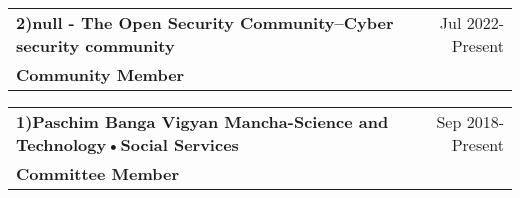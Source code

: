 \documentclass[a4paper,12pt]{article}
\begin{document}
\begin{tabularx}{\linewidth}{ @{}l r@{} }
\textbf{2)null - The Open Security Community--Cyber security community}&\hfill Jul 2022-Present \\[3.75pt]

\textbf{Community Member}  
\end{tabularx}
\begin{tabularx}{\linewidth}{ @{}l r@{} }
\textbf{1)Paschim Banga Vigyan Mancha-Science and Technology•Social Services
} & \hfill Sep 2018-Present  \\[3.75pt]
\textbf{Committee Member}
\end{tabularx}
\vfill
{}\\[0.69pt]
\end{document}
